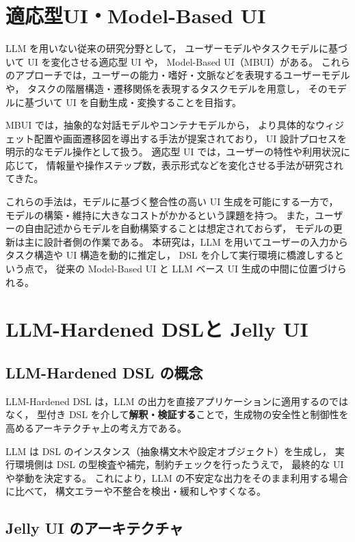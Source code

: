 \documentclass[senior,final,11pt,dvipdfmx]{iputit-thesis}
\begin{document}
\section{適応型UI・Model-Based UI}

LLM を用いない従来の研究分野として，
ユーザーモデルやタスクモデルに基づいて UI を変化させる適応型 UI や，
Model-Based UI（MBUI）がある\cite{puerta1998mbui,myers1995uisoft}。
これらのアプローチでは，ユーザーの能力・嗜好・文脈などを表現するユーザーモデルや，
タスクの階層構造・遷移関係を表現するタスクモデルを用意し，
そのモデルに基づいて UI を自動生成・変換することを目指す\cite{gajos2007supple}。

MBUI では，抽象的な対話モデルやコンテナモデルから，
より具体的なウィジェット配置や画面遷移図を導出する手法が提案されており，
UI 設計プロセスを明示的なモデル操作として扱う。
適応型 UI では，ユーザーの特性や利用状況に応じて，
情報量や操作ステップ数，表示形式などを変化させる手法が研究されてきた\cite{barrera2014tukuchiy}。

これらの手法は，モデルに基づく整合性の高い UI 生成を可能にする一方で，
モデルの構築・維持に大きなコストがかかるという課題を持つ。
また，ユーザーの自由記述からモデルを自動構築することは想定されておらず，
モデルの更新は主に設計者側の作業である。
本研究は，LLM を用いてユーザーの入力からタスク構造や UI 構造を動的に推定し，
DSL を介して実行環境に橋渡しするという点で，
従来の Model-Based UI と LLM ベース UI 生成の中間に位置づけられる。

\section{LLM-Hardened DSLと Jelly UI}

\subsection{LLM-Hardened DSL の概念}

LLM-Hardened DSL は，LLM の出力を直接アプリケーションに適用するのではなく，
型付き DSL を介して\textbf{解釈・検証する}ことで，生成物の安全性と制御性を高めるアーキテクチャ上の考え方である\cite{deanmai2025dsl}。

LLM は DSL のインスタンス（抽象構文木や設定オブジェクト）を生成し，
実行環境側は DSL の型検査や補完，制約チェックを行ったうえで，
最終的な UI や挙動を決定する。
これにより，LLM の不安定な出力をそのまま利用する場合に比べて，
構文エラーや不整合を検出・緩和しやすくなる。

\subsection{Jelly UI のアーキテクチャ}
\end{document}
